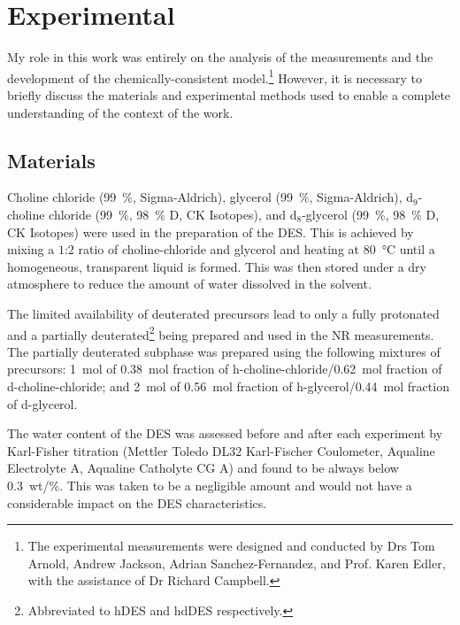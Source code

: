 \section{Experimental}
My role in this work was entirely on the analysis of the measurements and the development of the chemically-consistent model.\footnote{The experimental measurements were designed and conducted by Drs Tom Arnold, Andrew Jackson, Adrian Sanchez-Fernandez, and Prof. Karen Edler, with the assistance of Dr Richard Campbell.}
However, it is necessary to briefly discuss the materials and experimental methods used to enable a complete understanding of the context of the work.

\subsection{Materials}
Choline chloride (\SI{99}{\percent}, Sigma-Aldrich), glycerol (\SI{99}{\percent}, Sigma-Aldrich), d$_{9}$-choline chloride (\SI{99}{\percent}, \SI{98}{\percent} D, CK Isotopes), and d$_{8}$-glycerol (\SI{99}{\percent}, \SI{98}{\percent} D, CK Isotopes) were used in the preparation of the DES.
This is achieved by mixing a $1$:$2$ ratio of choline-chloride and glycerol and heating at \SI{80}{\celsius} until a homogeneous, transparent liquid is formed.\autocite{smith_deep_2014}
This was then stored under a dry atmosphere to reduce the amount of water dissolved in the solvent.

The limited availability of deuterated precursors lead to only a fully protonated and a partially deuterated\footnote{Abbreviated to hDES and hdDES respectively.} being prepared and used in the NR measurements.
The partially deuterated subphase was prepared using the following mixtures of precursors: \SI{1}{\mole} of \SI{0.38}{\mole} fraction of h-choline-chloride/\SI{0.62}{\mole} fraction of d-choline-chloride; and \SI{2}{\mole} of \SI{0.56}{\mole} fraction of h-glycerol/\SI{0.44}{\mole} fraction of d-glycerol.

The water content of the DES was assessed before and after each experiment by Karl-Fisher titration (Mettler Toledo DL32 Karl-Fischer Coulometer, Aqualine Electrolyte A, Aqualine Catholyte CG A) and found to be always below \SI{0.3}{wt/\percent}.
This was taken to be a negligible amount and would not have a considerable impact on the DES characteristics.\autocite{hammond_liquid_2016,hammond_resilience_2017}

